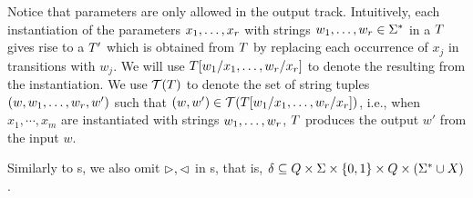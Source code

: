 Notice that parameters are only allowed in the output track.
Intuitively, each instantiation of the parameters $x_1,\ldots,x_r$ with strings 
$w_1,\ldots, w_r \in \Sigma^*$ in a \PPT{} $T$ gives rise to a \FFT{} $T'$ which is obtained from $T$ by replacing each occurrence of $x_j$ in transitions with $w_j$.
We will use $T[w_1/x_1,\ldots,w_r/x_r]$ to denote the \FFT{} resulting from the instantiation.
%
We use $\mathcal{T}(T)$ to denote the set of string tuples 
$(w, w_1, \ldots, w_r, w')$ such that 
$(w,w') \in \mathcal{T}(T[w_1/x_1,\ldots,w_r/x_r])$, i.e., when
$x_1,\cdots, x_m$ are instantiated with strings $w_1,\ldots, w_r$, 
$T$ produces the output $w'$ from the input $w$. 

%
%
Similarly to \FT{}s, we also omit $\vartriangleright, \vartriangleleft$ in \PT{}s, that is, $\delta \subseteq Q \times 
    \Sigma \times \{0, 1\} \times 
    Q \times (\Sigma^* \cup X)$.




